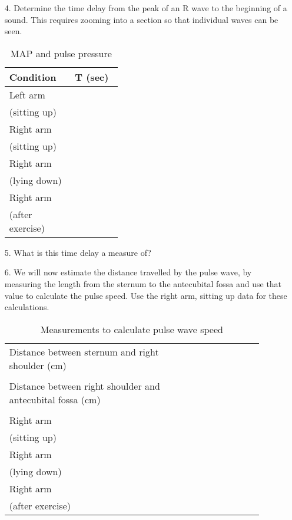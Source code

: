 \documentclass{article}
\begin{document}
\begin{itemize}
	\item[4.] Determine the time delay from the peak of an R wave to the beginning of a sound. This requires zooming into a section so that individual waves can be seen.
	\begin{table}[h]
	\centering
	\caption{MAP and pulse pressure}
	\begin{tabular}[h!]{p{0.15\linewidth}|p{0.25\linewidth}}
	\toprule
	Condition & \textDelta T (sec) \\
	\midrule
	Left arm & \\(sitting up) & \\\midrule
	Right arm & \\(sitting up) & \\\midrule
	Right arm & \\(lying down) & \\\midrule
	Right arm & \\(after exercise) & \\
	\bottomrule
	\end{tabular}
	\end{table}\vspace{0cm}
	
	\item[5.] What is this time delay a measure of?\pagebreak
	\item[6.] We will now estimate the distance travelled by the pulse wave, by measuring the length from the sternum to the antecubital fossa and use that value to calculate the pulse speed. Use the right arm, sitting up data for these calculations.
	
	\begin{table}[h]
	\centering
	\caption{Measurements to calculate pulse wave speed}
	\begin{tabular}[h!]{p{0.65\linewidth}|p{0.25\linewidth}}
	\toprule
	Distance between sternum and right shoulder (cm) & \\ & \\\midrule
	Distance between right shoulder and antecubital fossa (cm) & \\ & \\\midrule
	Right arm & \\(sitting up) & \\\midrule
	Right arm & \\(lying down) & \\\midrule
	Right arm & \\(after exercise) & \\
	\bottomrule
	\end{tabular}
	\end{table}\vspace{0cm}
	

\end{itemize}
\end{document}
